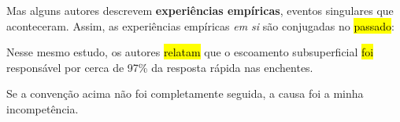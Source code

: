 \documentclass[./main.tex]{subfiles}
\begin{document}
\noindent Mas alguns autores descrevem \textbf{experiências empíricas}, eventos singulares que aconteceram. Assim, as experiências empíricas \textit{em si} são conjugadas no \hl{passado}:

\begin{adjustwidth}{100pt}{0pt}
\medskip
\small
Nesse mesmo estudo, os autores \hl{relatam} que o escoamento subsuperficial \hl{foi} responsável por cerca de 97\% da resposta rápida nas enchentes.
\medskip
\end{adjustwidth}

\vspace{10mm}

\noindent Se a convenção acima não foi completamente seguida, a causa foi a minha incompetência.




\clearpage
\end{document}
